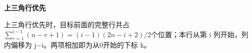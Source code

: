 {\color{ink}\bfseries 上三角行优先}\par\vspace{1bp}上三角行优先时，目标前面的完整行共占\(\sum_{r=\allowbreak{}1}^{i-1}(n-r+\allowbreak{}1)=\allowbreak{}(i-1)(2n-i+\allowbreak{}2)/\allowbreak{}2\)个位置；本行从第 i 列开始，列内偏移为 j\(-\)i。两项相加即为从0开始的下标 k。

